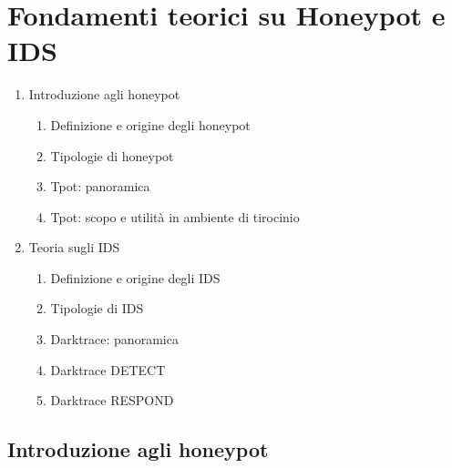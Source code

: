 \chapter{Fondamenti teorici su Honeypot e IDS}
\begin{enumerate}
	\item Introduzione agli honeypot
	\begin{enumerate}
		\item Definizione e origine degli honeypot
		\item Tipologie di honeypot
		\item Tpot: panoramica
		\item Tpot: scopo e utilità in ambiente di tirocinio
	\end{enumerate}
	\item Teoria sugli IDS
	\begin{enumerate}
		\item Definizione e origine degli IDS
		\item Tipologie di IDS
		\item Darktrace: panoramica
		\item Darktrace DETECT
		\item Darktrace RESPOND
	\end{enumerate}
\end{enumerate}
\section{Introduzione agli honeypot}
